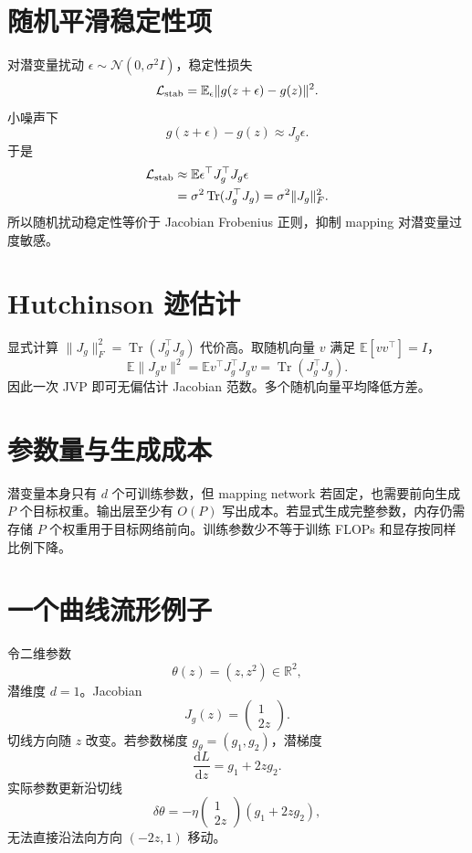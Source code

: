 \documentclass[UTF8,12pt,a4paper,fontset=none]{ctexart}
\numberwithin{equation}{section}
\newcommand{\R}{\mathbb{R}}
\newcommand{\E}{\mathbb{E}}
\newcommand{\Loss}{\mathcal{L}}
\newcommand{\tr}{\operatorname{Tr}}
\newcommand{\dd}{\mathrm{d}}
\begin{document}
\section{随机平滑稳定性项}
对潜变量扰动 $\epsilon\sim\mathcal N(0,\sigma^2I)$，稳定性损失
\begin{equation}
 \Loss_{\rm stab}=\E_\epsilon
 \|g(z+\epsilon)-g(z)\|^2.
\end{equation}
小噪声下
\begin{equation}
 g(z+\epsilon)-g(z)
 \approx J_g\epsilon.
\end{equation}
于是
\begin{align}
 \Loss_{\rm stab}
 &\approx\E\epsilon^\top J_g^\top J_g\epsilon\\
 &=\sigma^2\tr(J_g^\top J_g)
 =\sigma^2\|J_g\|_F^2.
\end{align}
所以随机扰动稳定性等价于 Jacobian Frobenius 正则，抑制 mapping 对潜变量过度敏感。

\section{Hutchinson 迹估计}
显式计算 $\|J_g\|_F^2=\tr(J_g^\top J_g)$ 代价高。取随机向量 $v$ 满足 $\E[vv^\top]=I$，
\begin{equation}
 \E\|J_gv\|^2
 =\E v^\top J_g^\top J_gv
 =\tr(J_g^\top J_g).
\end{equation}
因此一次 JVP 即可无偏估计 Jacobian 范数。多个随机向量平均降低方差。

\section{参数量与生成成本}
潜变量本身只有 $d$ 个可训练参数，但 mapping network 若固定，也需要前向生成 $P$ 个目标权重。输出层至少有 $O(P)$ 写出成本。若显式生成完整参数，内存仍需存储 $P$ 个权重用于目标网络前向。训练参数少不等于训练 FLOPs 和显存按同样比例下降。

\section{一个曲线流形例子}
令二维参数
\begin{equation}
 \theta(z)=(z,z^2)\in\R^2,
\end{equation}
潜维度 $d=1$。Jacobian
\begin{equation}
 J_g(z)=\begin{pmatrix}1\\2z\end{pmatrix}.
\end{equation}
切线方向随 $z$ 改变。若参数梯度 $g_\theta=(g_1,g_2)$，潜梯度
\begin{equation}
 \frac{\dd L}{\dd z}=g_1+2zg_2.
\end{equation}
实际参数更新沿切线
\begin{equation}
 \delta\theta=-\eta
 \begin{pmatrix}1\\2z\end{pmatrix}(g_1+2zg_2),
\end{equation}
无法直接沿法向方向 $( -2z,1)$ 移动。
\end{document}
